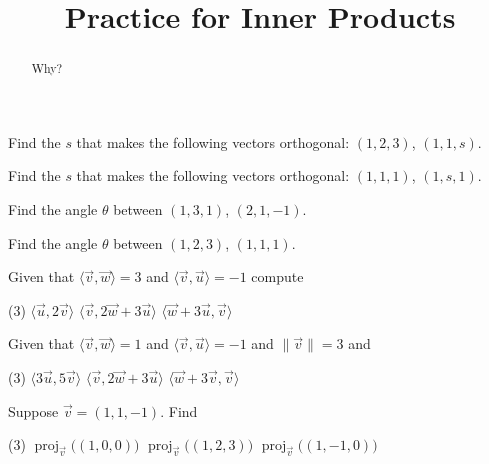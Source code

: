 \documentclass{ximera}
\title{Practice for Inner Products}
\begin{document}
\begin{abstract}
Why?
\end{abstract}
\maketitle



\begin{exercise}
    Find the $s$ that makes the following vectors orthogonal: $(1,2,3)$, $(1,1,s)$.
\end{exercise}

\begin{exercise}%
    Find the $s$ that makes the following vectors orthogonal: $(1,1,1)$, $(1,s,1)$.
\end{exercise}


\begin{exercise}
    Find the angle $\theta$ between $(1,3,1)$, $(2,1,-1)$.
\end{exercise}

\begin{exercise}
    Find the angle $\theta$ between $(1,2,3)$, $(1,1,1)$.
\end{exercise}


\begin{exercise}
    Given that $\langle \vec{v} , \vec{w} \rangle = 3$ and $\langle \vec{v} , \vec{u} \rangle = -1$ compute
    \begin{tasks}(3)
        \task $\langle \vec{u} , 2 \vec{v} \rangle$
        \task $\langle \vec{v} , 2 \vec{w} + 3 \vec{u} \rangle$
        \task $\langle \vec{w} + 3 \vec{u}, \vec{v} \rangle$
    \end{tasks}
\end{exercise}

\begin{exercise}
    Given that $\langle \vec{v} , \vec{w} \rangle = 1$ and $\langle \vec{v} , \vec{u} \rangle = -1$  and $\lVert \vec{v} \rVert = 3$  and
    \begin{tasks}(3)
        \task $\langle 3 \vec{u} , 5 \vec{v} \rangle$
        \task $\langle \vec{v} , 2 \vec{w} + 3 \vec{u} \rangle$
        \task $\langle \vec{w} + 3 \vec{v}, \vec{v} \rangle$
    \end{tasks}
\end{exercise}


\begin{exercise}
    Suppose $\vec{v} = (1,1,-1)$.  Find
    \begin{tasks}(3)
        \task $\operatorname{proj}_{\vec{v}}\bigl( (1,0,0) \bigr)$
        \task $\operatorname{proj}_{\vec{v}}\bigl( (1,2,3) \bigr)$
        \task $\operatorname{proj}_{\vec{v}}\bigl( (1,-1,0) \bigr)$
    \end{tasks}
\end{exercise}
\end{document}
